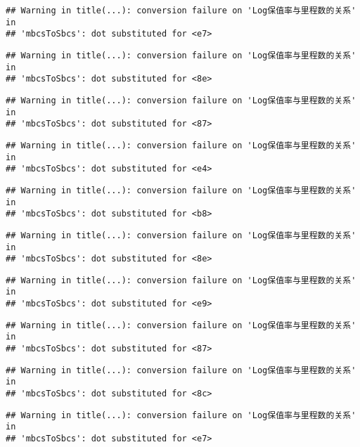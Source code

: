 \documentclass[]{article}
\begin{document}
\begin{verbatim}
## Warning in title(...): conversion failure on 'Log保值率与里程数的关系' in
## 'mbcsToSbcs': dot substituted for <e7>
\end{verbatim}

\begin{verbatim}
## Warning in title(...): conversion failure on 'Log保值率与里程数的关系' in
## 'mbcsToSbcs': dot substituted for <8e>
\end{verbatim}

\begin{verbatim}
## Warning in title(...): conversion failure on 'Log保值率与里程数的关系' in
## 'mbcsToSbcs': dot substituted for <87>
\end{verbatim}

\begin{verbatim}
## Warning in title(...): conversion failure on 'Log保值率与里程数的关系' in
## 'mbcsToSbcs': dot substituted for <e4>
\end{verbatim}

\begin{verbatim}
## Warning in title(...): conversion failure on 'Log保值率与里程数的关系' in
## 'mbcsToSbcs': dot substituted for <b8>
\end{verbatim}

\begin{verbatim}
## Warning in title(...): conversion failure on 'Log保值率与里程数的关系' in
## 'mbcsToSbcs': dot substituted for <8e>
\end{verbatim}

\begin{verbatim}
## Warning in title(...): conversion failure on 'Log保值率与里程数的关系' in
## 'mbcsToSbcs': dot substituted for <e9>
\end{verbatim}

\begin{verbatim}
## Warning in title(...): conversion failure on 'Log保值率与里程数的关系' in
## 'mbcsToSbcs': dot substituted for <87>
\end{verbatim}

\begin{verbatim}
## Warning in title(...): conversion failure on 'Log保值率与里程数的关系' in
## 'mbcsToSbcs': dot substituted for <8c>
\end{verbatim}

\begin{verbatim}
## Warning in title(...): conversion failure on 'Log保值率与里程数的关系' in
## 'mbcsToSbcs': dot substituted for <e7>
\end{verbatim}
\end{document}

